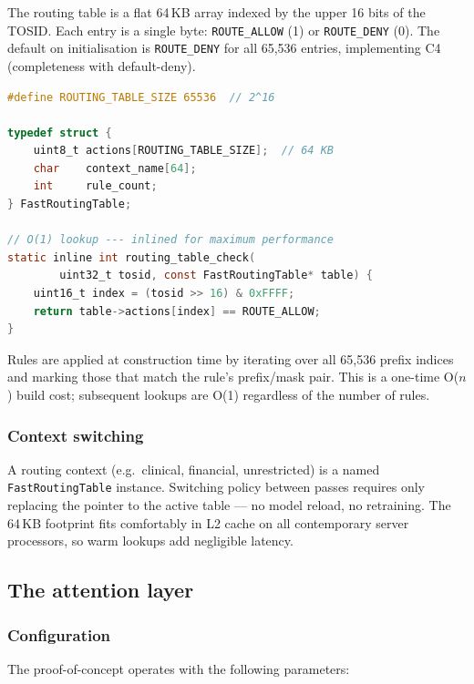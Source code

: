 \documentclass[11pt,a4paper]{article}
\theoremstyle{definition}
\begin{document}
The routing table is a flat 64\,KB array indexed by the upper 16 bits of the
TOSID\@. Each entry is a single byte: \texttt{ROUTE\_ALLOW} (1) or
\texttt{ROUTE\_DENY} (0). The default on initialisation is \texttt{ROUTE\_DENY}
for all 65,536 entries, implementing C4 (completeness with default-deny).

\begin{lstlisting}[language=C, caption={Routing table structure and O(1) lookup.},
                   label=lst:lookup]
#define ROUTING_TABLE_SIZE 65536  // 2^16

typedef struct {
    uint8_t actions[ROUTING_TABLE_SIZE];  // 64 KB
    char    context_name[64];
    int     rule_count;
} FastRoutingTable;

// O(1) lookup --- inlined for maximum performance
static inline int routing_table_check(
        uint32_t tosid, const FastRoutingTable* table) {
    uint16_t index = (tosid >> 16) & 0xFFFF;
    return table->actions[index] == ROUTE_ALLOW;
}
\end{lstlisting}

Rules are applied at construction time by iterating over all 65,536 prefix
indices and marking those that match the rule's prefix/mask pair. This is a
one-time O($n$) build cost; subsequent lookups are O(1) regardless of the
number of rules.

\subsubsection{Context switching}

A routing context (e.g.\ clinical, financial, unrestricted) is a named
\texttt{FastRoutingTable} instance. Switching policy between passes requires
only replacing the pointer to the active table --- no model reload, no
retraining. The 64\,KB footprint fits comfortably in L2 cache on all
contemporary server processors, so warm lookups add negligible latency.

\subsection{The attention layer}
\label{sec:attentionlayer}

\subsubsection{Configuration}

The proof-of-concept operates with the following parameters:
\end{document}
